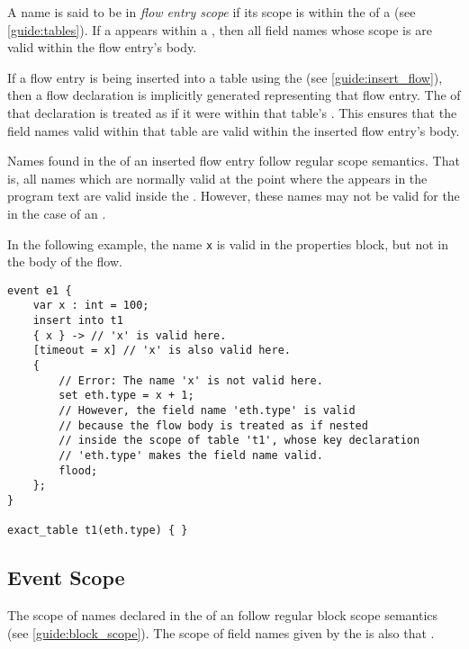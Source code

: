 A name is said to be in \textit{flow entry scope} if its scope is within the  of a  (see \ref{guide:tables}). If a  appears within a , then all field names whose scope is  are valid within the flow entry's body.

If a flow entry is being inserted into a table using the  (see \ref{guide:insert_flow}), then a flow declaration is implicitly generated representing that flow entry. The  of that declaration is treated as if it were within that table's . This ensures that the field names valid within that table are valid within the inserted flow entry's body.

Names found in the  of an inserted flow entry follow regular scope semantics. That is, all names which are normally valid at the point where the  appears in the program text are valid inside the . However, these names may not be valid for the  in the case of an .

In the following example, the name \texttt{x} is valid in the properties block, but not in the body of the flow.

\begin{minip}
\begin{lstlisting}
event e1 {
	var x : int = 100;
	insert into t1
	{ x } -> // 'x' is valid here.
	[timeout = x] // 'x' is also valid here.
	{
		// Error: The name 'x' is not valid here.
		set eth.type = x + 1;
		// However, the field name 'eth.type' is valid
		// because the flow body is treated as if nested
		// inside the scope of table 't1', whose key declaration
		// 'eth.type' makes the field name valid.
		flood;
	};
}

exact_table t1(eth.type) { }
\end{lstlisting}
\end{minip}

\subsection{Event Scope} \label{guide:event_scope}

The scope of names declared in the  of an  follow regular block scope semantics (see \ref{guide:block_scope}). The scope of field names given by the  is also that .

